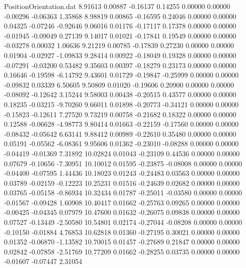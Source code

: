 \begin{filecontents}{PositionOrientation.dat}
   8.91613    0.00887   -0.16137     0.14255    0.00000    0.00000   -0.00296   -0.06363    1.35868
   8.98819    0.00865   -0.16595     0.24046    0.00000    0.00000    0.04325   -0.07246   -0.92646
   9.06016    0.01176   -0.17117     0.17378    0.00000    0.00000   -0.01945   -0.09049    0.27139
   9.14017    0.01021   -0.17841     0.19549    0.00000    0.00000   -0.03278    0.00032    1.06636
   9.21219    0.00785   -0.17839     0.27230    0.00000    0.00000    0.01904   -0.02927   -1.09833
   9.28414    0.00922   -0.18049     0.19328    0.00000    0.00000   -0.07291   -0.03200    0.53482
   9.35603    0.00397   -0.18279     0.23173    0.00000    0.00000    0.16646   -0.19598   -6.14792
   9.43601    0.01729   -0.19847    -0.25999    0.00000    0.00000   -0.09832    0.03339    6.50605
   9.50809    0.01020   -0.19606     0.20900    0.00000    0.00000   -0.08092   -0.12642    3.15244
   9.58003    0.00438   -0.20515     0.43577    0.00000    0.00000    0.18235   -0.03215   -9.70260
   9.66011    0.01898   -0.20773    -0.34121    0.00000    0.00000   -0.15823   -0.12611    7.27520
   9.73219    0.00758   -0.21682     0.18322    0.00000    0.00000    0.12588   -0.06628   -4.98773
   9.80414    0.01663   -0.22159    -0.17560    0.00000    0.00000   -0.08432   -0.05642    6.63141
   9.88412    0.00989   -0.22610     0.35480    0.00000    0.00000    0.05191   -0.05562   -6.08361
   9.95606    0.01362   -0.23010    -0.08288    0.00000    0.00000   -0.04419   -0.01369    7.31892
  10.02824    0.01043   -0.23109     0.44536    0.00000    0.00000    0.07679   -0.10656   -7.30951
  10.10012    0.01595   -0.23875    -0.08008    0.00000    0.00000   -0.04400   -0.07595    1.44436
  10.18023    0.01243   -0.24483     0.03563    0.00000    0.00000    0.03789   -0.02159   -0.12223
  10.25231    0.01516   -0.24639     0.02682    0.00000    0.00000    0.03765   -0.05158   -0.86934
  10.32434    0.01787   -0.25011    -0.03580    0.00000    0.00000   -0.01567   -0.09428    1.60908
  10.40417    0.01662   -0.25763     0.09265    0.00000    0.00000   -0.00425   -0.04345    0.07979
  10.47600    0.01632   -0.26075     0.09838    0.00000    0.00000    0.07527   -0.13449   -2.50580
  10.54801    0.02174   -0.27044    -0.08208    0.00000    0.00000   -0.10150   -0.01884    4.76853
  10.62818    0.01360   -0.27195     0.30021    0.00000    0.00000    0.01352   -0.06870   -1.13582
  10.70015    0.01457   -0.27689     0.21847    0.00000    0.00000    0.02842   -0.07858   -2.51769
  10.77209    0.01662   -0.28255     0.03735    0.00000    0.00000   -0.01607   -0.07447    2.31054

\end{filecontents}
